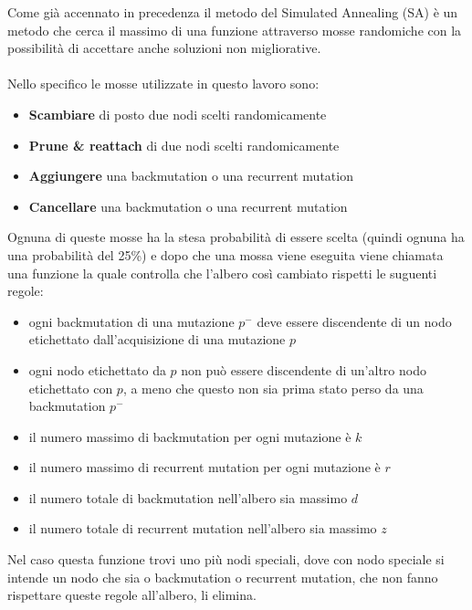 \documentclass[12pt]{report}
\begin{document}
  Come già accennato in precedenza il metodo del Simulated Annealing (SA) è un metodo che cerca il massimo di una funzione attraverso mosse randomiche con la possibilità di accettare anche soluzioni non migliorative.\\\\
  Nello specifico le mosse utilizzate in questo lavoro sono:
  \begin{itemize}
    \item \textbf{Scambiare} di posto due nodi scelti randomicamente

    \item \textbf{Prune \& reattach} di due nodi scelti randomicamente

    \item \textbf{Aggiungere} una backmutation o una recurrent mutation

    \item \textbf{Cancellare} una backmutation o una recurrent mutation
  \end{itemize}
  Ognuna di queste mosse ha la stesa probabilità di essere scelta (quindi ognuna ha una probabilità del 25\%) e dopo che una mossa viene eseguita viene chiamata una funzione la quale controlla che l'albero così cambiato rispetti le suguenti regole:
  \begin{itemize}
    \item ogni backmutation di una mutazione $p^-$ deve essere discendente di un nodo etichettato dall'acquisizione di una mutazione $p$

    \item ogni nodo etichettato da $p$ non può essere discendente di un'altro nodo etichettato con $p$, a meno che questo non sia prima stato perso da una backmutation $p^-$

    \item il numero massimo di backmutation per ogni mutazione è $k$

    \item il numero massimo di recurrent mutation per ogni mutazione è $r$

    \item il numero totale di backmutation nell'albero sia massimo $d$

    \item il numero totale di recurrent mutation nell'albero sia massimo $z$
  \end{itemize}
  Nel caso questa funzione trovi uno più nodi speciali, dove con nodo speciale si intende un nodo che sia o backmutation o recurrent mutation, che non fanno rispettare queste regole all'albero, li elimina.\\\\
\end{document}
